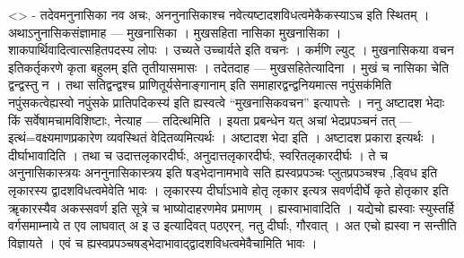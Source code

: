 \textless{}\textgreater{} - तदेवमनुनासिका नव अचः, अननुनासिकाश्च
नवेत्यष्टादशविधत्वमेकैकस्याऽच इति स्थितम् । अथाऽनुनासिकसंज्ञामाह ---
मुखनासिका । मुखसहिता नासिका मुखनासिका । शाकपार्थिवादित्वात्सहितपदस्य
लोपः । उच्यते उच्चार्यते इति वचनः । कर्मणि ल्युट् । मुखनासिकया वचन
इतिकर्तृकरणे कृता बहुलम् इति तृतीयासमासः । तदेतदाह --- मुखसहितेत्यादिना
। मुखं च नासिका चेति द्वन्द्वस्तु न । तथा सतिद्वन्द्वश्च
प्राणितूर्यसेनाङ्गानाम् इति समाहारद्वन्द्वनियमात्स नपुंसक॑मिति
नपुंसकत्वेह्यस्वो नपुंसके प्रातिपदिकस्य॑ इति ह्यस्वत्वे ``मुखनासिकवचन''
इत्यापत्तेः । ननु अष्टादश भेदाः किं सर्वेषामचामविशिष्टाः, नेत्याह ---
तदित्थमिति । इयता प्रबन्धेन यत् अचां भेदप्रपञ्चनं तत् ---
इत्थं=वक्ष्यमाणप्रकारेण व्यवस्थितं वेदितव्यमित्यर्थः । अष्टादश भेदा इति
। अष्टादश प्रकारा इत्यर्थः । दीर्घाभावादिति । तथा च उदात्तलृकारदीर्घः,
अनुदात्तलृकारदीर्घः, स्वरितलृकारदीर्घः । ते च अनुनासिकास्त्रयः
अननुनासिकास्त्रय इति षड्भेदानामभावे सति ह्यस्वप्रपञ्चः प्लुतप्रपञ्चश्च
,ड्विध इति लृकारस्य द्वादशविधत्वमेवेति भावः । लृकारस्य दीर्घाऽभावे होतृ
लृकार इत्यत्र सवर्णदीर्घे कृते होतृकार इति ॠकारस्यैव अकस्सवर्ण इति
सूत्रे च भाष्योदाहरणमेव प्रमाणम् । ह्यस्वाभावादिति । यद्येचो ह्यस्वाः
स्युस्तर्हि वर्गसमाम्नाये त एव लाघवात् अ इ उ इत्यादिवत् पठएरन्, नतु
दीर्घाः, गौरवात् । अत एचो ह्यस्वा न सन्तीति विज्ञायते । एवं च
ह्यस्वप्रपञ्चषड्भेदाभावाद्द्वादशविधत्वमेवैचामिति भावः ।

